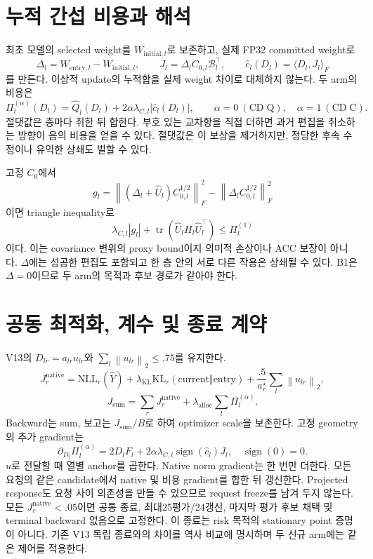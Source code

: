 \documentclass[11pt]{article}
\newcommand{\norm}[1]{\left\lVert #1\right\rVert}
\begin{document}
\section{누적 간섭 비용과 해석}
최초 모델의 selected weight를 $W_{\mathrm{initial},l}$로 보존하고,
실제 FP32 committed weight로
\[
 \Delta_l=W_{\mathrm{entry},l}-W_{\mathrm{initial},l},\qquad
 J_l=\Delta_l C_{0,l}\mathcal B_l^\top,\qquad
 \widehat c_l(D_l)=\langle D_l,J_l\rangle_F
\]
를 만든다. 이상적 update의 누적합을 실제 weight 차이로 대체하지 않는다.
두 arm의 비용은
\[
 \boxed{\Pi_l^{(\alpha)}(D_l)=\widehat Q_l(D_l)
          +2\alpha\lambda_{C,l}|\widehat c_l(D_l)|},\qquad
 \alpha=0\ (\mathrm{CD\!\!\;Q}),\quad \alpha=1\ (\mathrm{CD\!\!\;C}).
\]
절댓값은 층마다 취한 뒤 합한다. 부호 있는 교차항을 직접 더하면 과거 편집을
취소하는 방향이 음의 비용을 얻을 수 있다. 절댓값은 이 보상을 제거하지만,
정당한 후속 수정이나 유익한 상쇄도 벌할 수 있다.

고정 $C_0$에서
\[
 g_l=\norm{(\Delta_l+\widehat U_l)C_{0,l}^{1/2}}_F^2
      -\norm{\Delta_l C_{0,l}^{1/2}}_F^2
\]
이면 triangle inequality로
\[
 \lambda_{C,l}|g_l|
 +\operatorname{tr}(\widehat U_lH_l\widehat U_l^\top)
 \le \Pi_l^{(1)}
\]
이다. 이는 covariance 변위의 proxy bound이지 의미적 손상이나 ACC 보장이 아니다.
$\Delta$에는 성공한 편집도 포함되고 한 층 안의 서로 다른 작용은 상쇄될 수 있다.
B1은 $\Delta=0$이므로 두 arm의 목적과 후보 경로가 같아야 한다.

\section{공동 최적화, 계수 및 종료 계약}
V13의 $D_{lr}=a_{lr}u_{lr}$와 $\sum_l\norm{u_{lr}}_2\le .75$를 유지한다.
\[
 J_r^{\mathrm{native}}=\mathrm{NLL}_r(\widehat Y)
 +\lambda_{\mathrm{KL}}\mathrm{KL}_r(\mathrm{current}\Vert\mathrm{entry})
 +\frac{.5}{a_r^\star}\sum_l\norm{u_{lr}}_2,
\]
\[
 J_{\mathrm{sum}}=\sum_rJ_r^{\mathrm{native}}
       +\lambda_{\mathrm{alloc}}\sum_l\Pi_l^{(\alpha)}.
\]
Backward는 sum, 보고는 $J_{\mathrm{sum}}/B$로 하여 optimizer scale을 보존한다.
고정 geometry의 추가 gradient는
\[
 \partial_{D_l}\Pi_l^{(\alpha)}
 =2D_lF_l+2\alpha\lambda_{C,l}\operatorname{sign}(\widehat c_l)J_l,
 \quad\operatorname{sign}(0)=0.
\]
$u$로 전달할 때 열별 anchor를 곱한다. Native norm gradient는 한 번만 더한다.
모든 요청의 같은 candidate에서 native 및 비용 gradient를 합한 뒤 갱신한다.
Projected response도 요청 사이 의존성을 만들 수 있으므로 request freeze를 남겨 두지 않는다.
모든 $J_r^{\mathrm{native}}<.05$이면 공통 종료, 최대25평가/24갱신,
마지막 평가 후보 채택 및 terminal backward 없음으로 고정한다.
이 종료는 risk 목적의 stationary point 증명이 아니다. 기존 V13 독립 종료와의
차이를 역사 비교에 명시하며 두 신규 arm에는 같은 제어를 적용한다.
\end{document}
